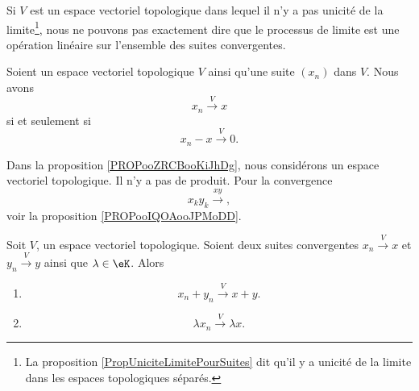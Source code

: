 Si \( V\) est un espace vectoriel topologique dans lequel il n'y a pas unicité de la limite\footnote{La proposition \ref{PropUniciteLimitePourSuites} dit qu'il y a unicité de la limite dans les espaces topologiques séparés.}, nous ne pouvons pas exactement dire que le processus de limite est une opération linéaire sur l'ensemble des suites convergentes.

\begin{lemma}       \label{LEMooJDJVooHUKdSe}
	Soient un espace vectoriel topologique \( V\) ainsi qu'une suite \( (x_n)\) dans \( V\). Nous avons
	\begin{equation}
		x_n\stackrel{V}{\longrightarrow}x
	\end{equation}
	si et seulement si
	\begin{equation}
		x_n-x\stackrel{V}{\longrightarrow}0.
	\end{equation}
\end{lemma}

Dans la proposition \ref{PROPooZRCBooKiJhDg}, nous considérons un espace vectoriel topologique. Il n'y a pas de produit. Pour la convergence
\begin{equation}
	x_ky_k\stackrel{ xy}{\longrightarrow},
\end{equation}
voir la proposition \ref{PROPooIQOAooJPMoDD}.

\begin{proposition}        \label{PROPooZRCBooKiJhDg}
	Soit \( V\), un espace vectoriel topologique. Soient deux suites convergentes \( x_n\stackrel{V}{\longrightarrow}x\) et \( y_n\stackrel{V}{\longrightarrow}y\) ainsi que \( \lambda\in \eK\). Alors
	\begin{enumerate}
		\item       \label{ITEMooSHPAooQyEkgT}
		      \begin{equation}
			      x_n+y_n\stackrel{V}{\longrightarrow}x+y.
		      \end{equation}
		\item   \label{ITEMooYHHYooYATzWE}
		      \begin{equation}
			      \lambda x_n\stackrel{V}{\longrightarrow}\lambda x.
		      \end{equation}
	\end{enumerate}
\end{proposition}

